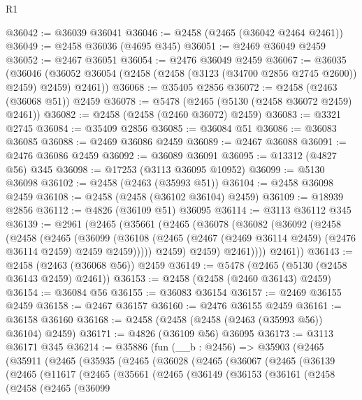 \begin{lexlean}{R1}
\begin{coremodule}
@36042 := @36039 @36041
@36046 := @2458 (@2465 (@36042 @2464 @2461))
@36049 := @2458 @36036 (@4695 @345)
@36051 := @2469 @36049 @2459
@36052 := @2467 @36051
@36054 := @2476 @36049 @2459
@36067 := @36035
    (@36046 (@36052 @36054 (@2458 (@2458 (@3123 (@34700 @2856 @2745 @2600)) @2459) @2459) @2461))
@36068 := @35405 @2856
@36072 := @2458 (@2463 (@36068 @51)) @2459
@36078 := @5478 (@2465 (@5130 (@2458 @36072 @2459) @2461))
@36082 := @2458 (@2458 (@2460 @36072) @2459)
@36083 := @3321 @2745
@36084 := @35409 @2856
@36085 := @36084 @51
@36086 := @36083 @36085
@36088 := @2469 @36086 @2459
@36089 := @2467 @36088
@36091 := @2476 @36086 @2459
@36092 := @36089 @36091
@36095 := @13312 (@4827 @56) @345
@36098 := @17253 (@3113 @36095 @10952)
@36099 := @5130 @36098
@36102 := @2458 (@2463 (@35993 @51))
@36104 := @2458 @36098 @2459
@36108 := @2458 (@2458 (@36102 @36104) @2459)
@36109 := @18939 @2856
@36112 := @4826 (@36109 @51) @36095
@36114 := @3113 @36112 @345
@36139 := @2961
    (@2465
      (@35661
        (@2465
          (@36078
            (@36082
              (@36092
                (@2458
                  (@2458
                    (@2465
                      (@36099
                        (@36108
                          (@2465 (@2467 (@2469 @36114 @2459) (@2476 @36114 @2459) @2459 @2459)))))
                    @2459)
                  @2459)
                @2461))))
        @2461))
@36143 := @2458 (@2463 (@36068 @56)) @2459
@36149 := @5478 (@2465 (@5130 (@2458 @36143 @2459) @2461))
@36153 := @2458 (@2458 (@2460 @36143) @2459)
@36154 := @36084 @56
@36155 := @36083 @36154
@36157 := @2469 @36155 @2459
@36158 := @2467 @36157
@36160 := @2476 @36155 @2459
@36161 := @36158 @36160
@36168 := @2458 (@2458 (@2458 (@2463 (@35993 @56)) @36104) @2459)
@36171 := @4826 (@36109 @56) @36095
@36173 := @3113 @36171 @345
@36214 := @35886
    (fun (__b : @2456) =>
    @35903
      (@2465
        (@35911
          (@2465
            (@35935
              (@2465
                (@36028
                  (@2465
                    (@36067
                      (@2465
                        (@36139
                          (@2465
                            (@11617
                              (@2465
                                (@35661
                                  (@2465
                                    (@36149
                                      (@36153
                                        (@36161
                                          (@2458
                                            (@2458
                                              (@2465
                                                (@36099

\end{coremodule}
\end{lexlean}
